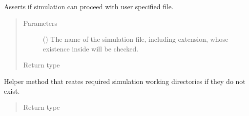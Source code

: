 \documentclass[letterpaper,10pt,english]{sphinxmanual}
\begin{document}
\begin{fulllineitems}
\label{\detokenize{app:app.hive_simulation.__can_exec_simfile__}}
Asserts if simulation can proceed with user specified file.
\begin{quote}\begin{description}
\item[{Parameters}] \leavevmode
{} () \textendash{} The name of the simulation file, including extension,
whose existence inside
{\hyperref[\detokenize{app:app.environment_settings.SIMULATION_ROOT}]{}} will be
checked.

\item[{Return type}] \leavevmode
{}

\end{description}\end{quote}

\end{fulllineitems}


\begin{fulllineitems}
\label{\detokenize{app:app.hive_simulation.__makedirs__}}
Helper method that reates required simulation working directories if
they do not exist.
\begin{quote}\begin{description}
\item[{Return type}] \leavevmode
{}

\end{description}\end{quote}

\end{fulllineitems}

\end{document}
